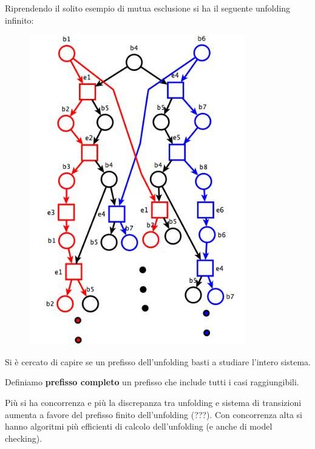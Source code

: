 \begin{esempio}
  Riprendendo il solito esempio di mutua esclusione si ha il seguente unfolding
  infinito:
  \begin{figure}[H]
    \centering
    \includegraphics[scale = 0.45]{img/unf.jpg} 
  \end{figure}
\end{esempio}
Si è cercato di capire se un prefisso dell'unfolding basti a studiare l'intero
sistema.
\begin{definizione}
  Definiamo \textbf{prefisso completo} un prefisso che include tutti i casi
  raggiungibili.
\end{definizione} \vspace{5mm} %
Più si ha concorrenza e più la discrepanza tra unfolding e sistema di
transizioni aumenta a favore del prefisso finito dell'unfolding (???). Con
concorrenza alta si hanno algoritmi più efficienti di calcolo dell'unfolding (e
anche di model checking).
